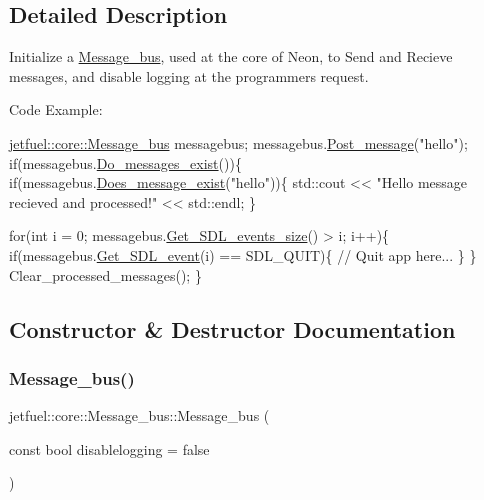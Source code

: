 \subsection{Detailed Description}
Initialize a \hyperlink{classjetfuel_1_1core_1_1Message__bus}{Message\+\_\+bus}, used at the core of Neon, to Send and Recieve messages, and disable logging at the programmer\textquotesingle{}s request.

Code Example\+: 
\begin{DoxyCode}
\hyperlink{classjetfuel_1_1core_1_1Message__bus}{jetfuel::core::Message\_bus} messagebus;
messagebus.\hyperlink{classjetfuel_1_1core_1_1Message__bus_a7a36c1ebc19327ddb554d6f8199a6965}{Post\_message}(\textcolor{stringliteral}{"hello"});
\textcolor{keywordflow}{if}(messagebus.\hyperlink{classjetfuel_1_1core_1_1Message__bus_a81015af8f393e028c4e9e670167aa013}{Do\_messages\_exist}())\{
   \textcolor{keywordflow}{if}(messagebus.\hyperlink{classjetfuel_1_1core_1_1Message__bus_a9bbbbea3cd97a8f8253e08b700dbd05d}{Does\_message\_exist}(\textcolor{stringliteral}{"hello"}))\{
       std::cout <<
       \textcolor{stringliteral}{"Hello message recieved and processed!"} << std::endl;
   \}

   \textcolor{keywordflow}{for}(\textcolor{keywordtype}{int} i = 0; messagebus.\hyperlink{classjetfuel_1_1core_1_1Message__bus_aa363b50d4ba99ae86430b5f12610fd39}{Get\_SDL\_events\_size}() > i; i++)\{
       \textcolor{keywordflow}{if}(messagebus.\hyperlink{classjetfuel_1_1core_1_1Message__bus_ab80c8b51aca00ad4942ee2114fdf2fec}{Get\_SDL\_event}(i) == SDL\_QUIT)\{
           \textcolor{comment}{// Quit app here...}
       \}
   \}
   Clear\_processed\_messages();
\}
\end{DoxyCode}
 

\subsection{Constructor \& Destructor Documentation}
\mbox{\label{classjetfuel_1_1core_1_1Message__bus_abf8b94890bd7223f9fa3f7d861ee96ab}} 
\subsubsection{\texorpdfstring{Message\+\_\+bus()}{Message\_bus()}}
{\footnotesize\ttfamily jetfuel\+::core\+::\+Message\+\_\+bus\+::\+Message\+\_\+bus (\begin{DoxyParamCaption}\item[{const bool}]{disablelogging = {\ttfamily false} }\end{DoxyParamCaption})}



